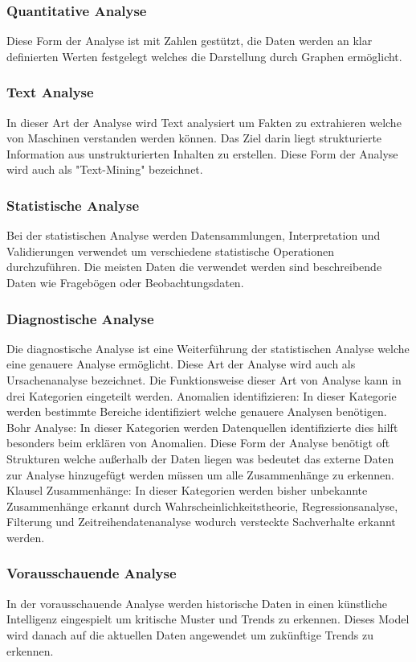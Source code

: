 \subsubsection{Quantitative Analyse}
Diese Form der Analyse ist mit Zahlen gestützt, die Daten werden an klar definierten Werten festgelegt welches die Darstellung durch Graphen ermöglicht.		
\subsubsection{Text Analyse}
In dieser Art der Analyse wird Text analysiert um Fakten zu extrahieren welche von Maschinen verstanden werden können. 
Das Ziel darin liegt strukturierte Information aus unstrukturierten Inhalten zu erstellen. Diese Form der Analyse wird auch als "Text-Mining" bezeichnet.		
\subsubsection{Statistische Analyse}
Bei der statistischen Analyse werden Datensammlungen, Interpretation und Validierungen verwendet um verschiedene statistische Operationen durchzuführen. 
Die meisten Daten die verwendet werden sind beschreibende Daten wie Fragebögen oder Beobachtungsdaten. 			
\subsubsection{Diagnostische Analyse}
Die diagnostische Analyse ist eine Weiterführung der statistischen Analyse welche eine genauere Analyse ermöglicht. Diese Art der Analyse wird auch als Ursachenanalyse bezeichnet. Die Funktionsweise dieser Art von Analyse kann in drei Kategorien eingeteilt werden. \newline
Anomalien identifizieren: In dieser Kategorie werden bestimmte Bereiche identifiziert welche genauere Analysen benötigen. \newline
Bohr Analyse: In dieser Kategorien werden Datenquellen identifizierte dies hilft besonders beim erklären von Anomalien. Diese Form der Analyse benötigt oft Strukturen welche außerhalb der Daten liegen was bedeutet das externe Daten zur Analyse hinzugefügt werden müssen um alle Zusammenhänge zu erkennen.  \newline
Klausel Zusammenhänge: In dieser Kategorien werden bisher unbekannte Zusammenhänge erkannt durch Wahrscheinlichkeitstheorie, Regressionsanalyse, Filterung und Zeitreihendatenanalyse wodurch versteckte Sachverhalte erkannt werden.  				
\subsubsection{Vorausschauende Analyse}
In der vorausschauende Analyse werden historische Daten in einen künstliche Intelligenz eingespielt um kritische Muster und Trends zu erkennen. 
Dieses Model wird danach auf die aktuellen Daten angewendet um zukünftige Trends zu erkennen. 
